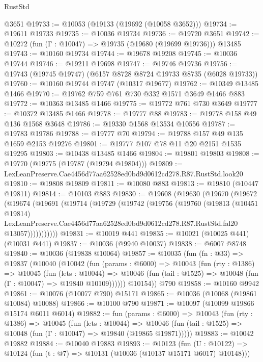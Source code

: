 \begin{lexlean}{RustStd}
\begin{coremodule}
{{    @3651
@19733 := @10053 (@19133 (@19692 (@10058 @3652)))
@19734 := @19611 @19733
@19735 := @10036 @19734
@19736 := @19720 @3651
@19742 := @10272 (fun (Γ : @10047) => @19735 (@19680 (@19699 @19736))) @13485
@19743 := @10160 @19734
@19744 := @19678 @19208
@19745 := @10036 @19744
@19746 := @19211 @19698
@19747 := @19746 @19736
@19756 := @19743 (@19745 @19747) (@6157 @8728 @8724 @19733 @8735 (@6028 @19733))
@19760 := @10160 @19744 @19747 (@10317 @19677)
@19762 := @10349 @13485 @1466
@19770 := @19762 @759 @761 @730 @332 @1571 @3649 @1466 @883
@19772 := @10363 @13485 @1466
@19775 := @19772 @761 @730 @3649
@19777 := @10372 @13485 @1466
@19778 := @19777 @88
@19783 := @19778 @158 @49 @136 @1568 @3648
@19786 := @19330 @1568 @13534 @10556
@19787 := @19783 @19786
@19788 := @19777 @70
@19794 := @19788 @157 @49 @135 @1659 @2153 @19276
@19801 := @19777 @107 @78 @11 @20 @2151 @1535 @19295
@19803 := @10438 @13485 @1466
@19804 := @19801 @19803
@19808 := @19770 (@19775 (@19787 (@19794 @19804)))
@19809 := LexLeanPreserve.Cae4456d77aa62528ed0bd9d0612cd278.R87.RustStd.look20
@19810 := @19808 @19809
@19811 := @10080 @883
@19813 := @19810 (@10447 @19811)
@19814 := @10103 @883
@19830 := @19608
    (@19630
      (@19670
        (@19672
          (@19674
            (@19691
              (@19714
                (@19729
                  (@19742
                    (@19756
                      (@19760
                        (@19813
                          (@10451 @19814)
                          LexLeanPreserve.Cae4456d77aa62528ed0bd9d0612cd278.R87.RustStd.fal20
                          @13057)))))))))))
@19831 := @10019 @441
@19835 := @10021 (@10025 @441) (@10031 @441)
@19837 := @10036 (@9940 @10037)
@19838 := @6007 @8748
@19840 := @10036 (@19838 @10064)
@19857 := @10035
    (fun (fn : @33) =>
    @19837
      (@10040
        (@10042
          (fun (params : @6000) =>
          @10043
            (fun (rty : @1386) =>
            @10045
              (fun (lets : @10044) =>
              @10046 (fun (tail : @1525) => @10048 (fun (Γ : @10047) => @19840 @10109))))))
        @10154))
    @790
@19858 := @10160 @9942
@19861 := @10076 (@10077 @790) @15171
@19865 := @10036 (@10068 (@19861 @10084) @10088)
@19866 := @10100 @790
@19871 := @10097 (@10099 @19866 @15174 @6011 @6014)
@19882 := fun (params : @6000) =>
  @10043
    (fun (rty : @1386) =>
    @10045
      (fun (lets : @10044) =>
      @10046 (fun (tail : @1525) => @10048 (fun (Γ : @10047) => @19840 (@19865 @19871)))))
@19883 := @10042 @19882
@19884 := @10040 @19883
@19893 := @10123
    (fun (U : @10122) => @10124 (fun (t : @7) => @10131 (@10036 (@10137 @15171 @6017) @10148)))
}}
\end{coremodule}
\end{lexlean}
